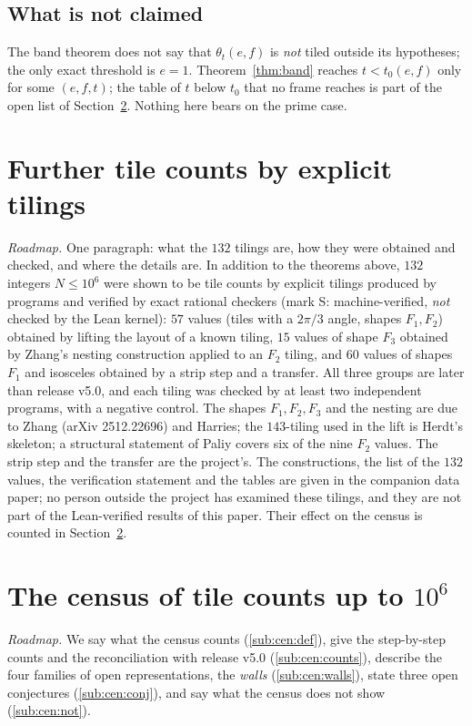 \documentclass[11pt,reqno]{amsart}
\theoremstyle{plain}
\theoremstyle{definition}
\newcommand{\sS}{\textup{\textsf{S}}}
\begin{document}
\subsection{What is not claimed}\label{sub:band:limits}
The band theorem does not say that $\theta_t(e,f)$ is \emph{not} tiled outside its hypotheses; the only exact
threshold is $e=1$. Theorem~\ref{thm:band} reaches $t<t_0(e,f)$ only for some $(e,f,t)$; the table of $t$ below $t_0$
that no frame reaches is part of the open list of Section~\ref{sec:census}. Nothing here bears on the prime case.
\section{Further tile counts by explicit tilings}\label{sec:tilings}
\emph{Roadmap.} One paragraph: what the $132$ tilings are, how they were obtained and checked, and where the details are.
In addition to the theorems above, $132$ integers $N\le10^6$ were shown to be tile counts by explicit tilings
produced by programs and verified by exact rational checkers (mark \sS: machine-verified, \emph{not} checked by the
Lean kernel): $57$ values (tiles with a $2\pi/3$ angle, shapes $F_1,F_2$) obtained by lifting the layout of a known
tiling, $15$ values of shape $F_3$ obtained by Zhang's nesting construction applied to an $F_2$ tiling, and $60$
values of shapes $F_1$ and isosceles obtained by a strip step and a transfer. All three groups are later than
release v5.0, and each tiling was checked by at least two independent programs, with a negative control. The shapes
$F_1,F_2,F_3$ and the nesting are due to Zhang (arXiv 2512.22696) and Harries; the $143$-tiling used in the lift is
Herdt's skeleton; a structural statement of Paliy covers six of the nine $F_2$ values. The strip step and the
transfer are the project's. The constructions, the list of the $132$ values, the verification statement and the
tables are given in the companion data paper; no person outside the project has examined these tilings, and they
are not part of the Lean-verified results of this paper. Their effect on the census is counted in
Section~\ref{sec:census}.

\section{The census of tile counts up to $10^6$}\label{sec:census}

\emph{Roadmap.} We say what the census counts (\ref{sub:cen:def}), give the step-by-step counts and the reconciliation with
release v5.0 (\ref{sub:cen:counts}), describe the four families of open representations, the \emph{walls} (\ref{sub:cen:walls}),
state three open conjectures (\ref{sub:cen:conj}), and say what the census does not show (\ref{sub:cen:not}).
\end{document}
